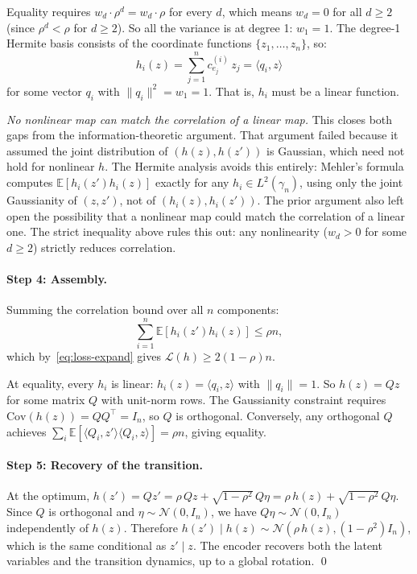 Equality requires $w_d \cdot \rho^d = w_d \cdot \rho$ for every $d$, which means $w_d = 0$ for all $d \geq 2$ (since $\rho^d < \rho$ for $d \geq 2$).
So all the variance is at degree 1: $w_1 = 1$.
The degree-1 Hermite basis consists of the coordinate functions $\{z_1, \ldots, z_n\}$, so:
\begin{equation}
    h_i(z) = \sum_{j=1}^n c_{e_j}^{(i)}\, z_j = \langle q_i, z\rangle
\end{equation}
for some vector $q_i$ with $\|q_i\|^2 = w_1 = 1$.
That is, $h_i$ must be a linear function.

\textit{No nonlinear map can match the correlation of a linear map.}
This closes both gaps from the information-theoretic argument.
That argument failed because it assumed the joint distribution of $(h(z), h(z'))$ is Gaussian, which need not hold for nonlinear $h$.
The Hermite analysis avoids this entirely: Mehler's formula computes $\mathbb{E}[h_i(z') h_i(z)]$ exactly for any $h_i \in L^2(\gamma_n)$, using only the joint Gaussianity of $(z, z')$, not of $(h_i(z), h_i(z'))$.
The prior argument also left open the possibility that a nonlinear map could match the correlation of a linear one.
The strict inequality above rules this out: any nonlinearity ($w_d > 0$ for some $d \geq 2$) strictly reduces correlation.


\paragraph{Step 4: Assembly.}
Summing the correlation bound over all $n$ components:
\begin{equation}
    \sum_{i=1}^n \mathbb{E}[h_i(z') h_i(z)] \leq \rho n,
\end{equation}
which by~\eqref{eq:loss-expand} gives $\mathcal{L}(h) \geq 2(1-\rho)n$.

At equality, every $h_i$ is linear: $h_i(z) = \langle q_i, z\rangle$ with $\|q_i\| = 1$.
So $h(z) = Qz$ for some matrix $Q$ with unit-norm rows.
The Gaussianity constraint requires $\mathrm{Cov}(h(z)) = Q Q^\top = I_n$, so $Q$ is orthogonal.
Conversely, any orthogonal $Q$ achieves $\sum_i \mathbb{E}[\langle Q_i, z'\rangle \langle Q_i, z\rangle] = \rho n$, giving equality.


\paragraph{Step 5: Recovery of the transition.}
At the optimum, $h(z') = Qz' = \rho\,Qz + \sqrt{1-\rho^2}\,Q\eta = \rho\,h(z) + \sqrt{1-\rho^2}\,Q\eta$.
Since $Q$ is orthogonal and $\eta \sim \mathcal{N}(0, I_n)$, we have $Q\eta \sim \mathcal{N}(0, I_n)$ independently of $h(z)$.
Therefore $h(z') \mid h(z) \sim \mathcal{N}(\rho\,h(z), (1-\rho^2)I_n)$, which is the same conditional as $z' \mid z$.
The encoder recovers both the latent variables and the transition dynamics, up to a global rotation. \qed

